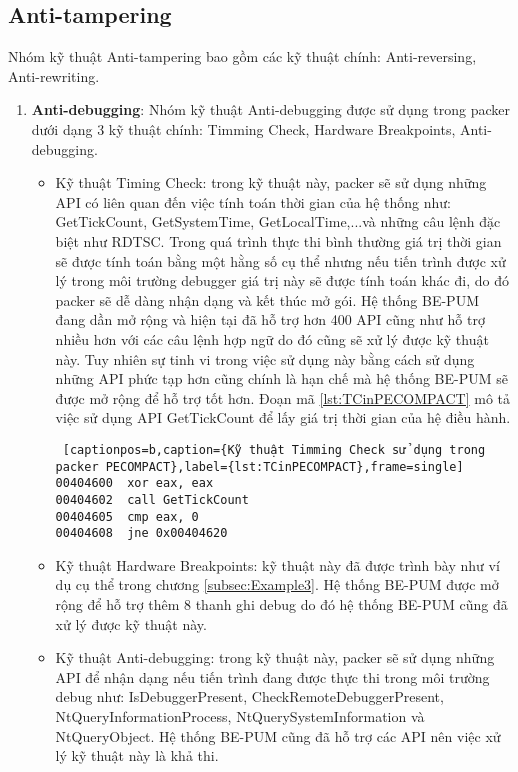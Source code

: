 \subsection{Anti-tampering}
\hspace{0.5cm}Nhóm kỹ thuật Anti-tampering bao gồm các kỹ thuật chính: Anti-reversing, Anti-rewriting.

\begin{enumerate}
\item{\textbf{Anti-debugging}: Nhóm kỹ thuật Anti-debugging được sử dụng trong packer dưới dạng 3 kỹ thuật chính: Timming Check, Hardware Breakpoints, Anti-debugging.
\begin{itemize}
\item{Kỹ thuật Timing Check: trong kỹ thuật này, packer sẽ sử dụng những API có liên quan đến việc tính toán thời gian của hệ thống như: GetTickCount, GetSystemTime, GetLocalTime,...và những câu lệnh đặc biệt như RDTSC. Trong quá trình thực thi bình thường giá trị thời gian sẽ được tính toán bằng một hằng số cụ thể nhưng nếu tiến trình được xử lý trong môi trường debugger giá trị này sẽ được tính toán khác đi, do đó packer sẽ dễ dàng nhận dạng và kết thúc mở gói. Hệ thống BE-PUM đang dần mở rộng và hiện tại đã hỗ trợ hơn 400 API cũng như hỗ trợ nhiều hơn với các câu lệnh hợp ngữ do đó cũng sẽ xử lý được kỹ thuật này. Tuy nhiên sự tinh vi trong việc sử dụng này bằng cách sử dụng những API phức tạp hơn cũng chính là hạn chế mà hệ thống BE-PUM sẽ được mở rộng để hỗ trợ tốt hơn. Đoạn mã \ref {lst:TCinPECOMPACT} mô tả việc sử dụng API GetTickCount để lấy giá trị thời gian của hệ điều hành.
\begin{code}
\begin{lstlisting} [captionpos=b,caption={Kỹ thuật Timming Check sử dụng trong packer PECOMPACT},label={lst:TCinPECOMPACT},frame=single]
00404600  xor eax, eax
00404602  call GetTickCount
00404605  cmp eax, 0
00404608  jne 0x00404620
\end{lstlisting}
\end{code}
}
\item{Kỹ thuật Hardware Breakpoints: kỹ thuật này đã được trình bày như ví dụ cụ thể trong chương \ref {subsec:Example3}. Hệ thống BE-PUM được mở rộng để hỗ trợ thêm 8 thanh ghi debug do đó hệ thống BE-PUM cũng đã xử lý được kỹ thuật này.\\}
\item{Kỹ thuật Anti-debugging: trong kỹ thuật này, packer sẽ sử dụng những API để nhận dạng nếu tiến trình đang được thực thi trong môi trường debug như: IsDebuggerPresent, CheckRemoteDebuggerPresent, NtQueryInformationProcess,  NtQuerySystemInformation và NtQueryObject. Hệ thống BE-PUM cũng đã hỗ trợ các API nên việc xử lý kỹ thuật này là khả thi. 
}
\end{itemize}}
\end{enumerate}
